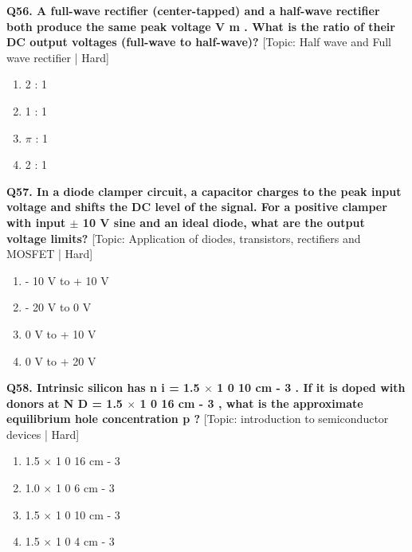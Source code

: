 \noindent\textbf{Q56. A full-wave rectifier (center-tapped) and a half-wave rectifier both produce the same peak voltage V m . What is the ratio of their DC output voltages (full-wave to half-wave)?} \hfill [Topic: Half wave and Full wave rectifier | Hard]
\begin{enumerate}[label=(\alph*),topsep=2pt,itemsep=1pt,partopsep=0pt,parsep=0pt]
    \item {2 : 1}
    \item {1 : 1}
    \item {$\pi$ : 1}
    \item {2 : 1}
\end{enumerate}
\vspace{2mm}

\noindent\textbf{Q57. In a diode clamper circuit, a capacitor charges to the peak input voltage and shifts the DC level of the signal. For a positive clamper with input $\pm$ 10 V sine and an ideal diode, what are the output voltage limits?} \hfill [Topic: Application of diodes, transistors, rectifiers and MOSFET | Hard]
\begin{enumerate}[label=(\alph*),topsep=2pt,itemsep=1pt,partopsep=0pt,parsep=0pt]
    \item {- 10 V to + 10 V}
    \item {- 20 V to 0 V}
    \item {0 V to + 10 V}
    \item {0 V to + 20 V}
\end{enumerate}
\vspace{2mm}

\noindent\textbf{Q58. Intrinsic silicon has n i = 1.5 $\times$ 1 0 10 cm - 3 . If it is doped with donors at N D = 1.5 $\times$ 1 0 16 cm - 3 , what is the approximate equilibrium hole concentration p ?} \hfill [Topic: introduction to semiconductor devices | Hard]
\begin{enumerate}[label=(\alph*),topsep=2pt,itemsep=1pt,partopsep=0pt,parsep=0pt]
    \item {1.5 $\times$ 1 0 16 cm - 3}
    \item {1.0 $\times$ 1 0 6 cm - 3}
    \item {1.5 $\times$ 1 0 10 cm - 3}
    \item {1.5 $\times$ 1 0 4 cm - 3}
\end{enumerate}
\vspace{2mm}

